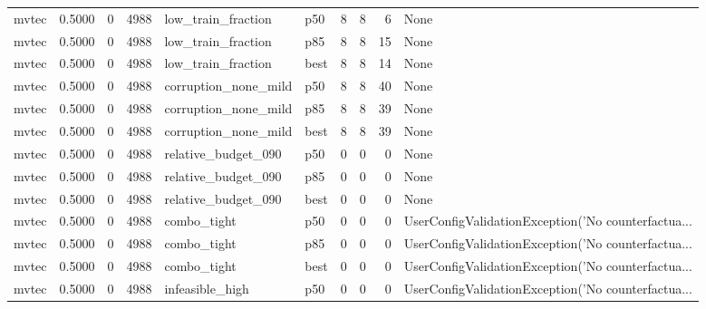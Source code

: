 \begin{tabular}{lrrrllrrrl}
   mvtec &    0.5000 &    0 &   4988 &   low\_train\_fraction &    p50 &               8 &          8 &       6 &                                               None \\
   mvtec &    0.5000 &    0 &   4988 &   low\_train\_fraction &    p85 &               8 &          8 &      15 &                                               None \\
   mvtec &    0.5000 &    0 &   4988 &   low\_train\_fraction &   best &               8 &          8 &      14 &                                               None \\
   mvtec &    0.5000 &    0 &   4988 & corruption\_none\_mild &    p50 &               8 &          8 &      40 &                                               None \\
   mvtec &    0.5000 &    0 &   4988 & corruption\_none\_mild &    p85 &               8 &          8 &      39 &                                               None \\
   mvtec &    0.5000 &    0 &   4988 & corruption\_none\_mild &   best &               8 &          8 &      39 &                                               None \\
   mvtec &    0.5000 &    0 &   4988 &  relative\_budget\_090 &    p50 &               0 &          0 &       0 &                                               None \\
   mvtec &    0.5000 &    0 &   4988 &  relative\_budget\_090 &    p85 &               0 &          0 &       0 &                                               None \\
   mvtec &    0.5000 &    0 &   4988 &  relative\_budget\_090 &   best &               0 &          0 &       0 &                                               None \\
   mvtec &    0.5000 &    0 &   4988 &          combo\_tight &    p50 &               0 &          0 &       0 & UserConfigValidationException('No counterfactua... \\
   mvtec &    0.5000 &    0 &   4988 &          combo\_tight &    p85 &               0 &          0 &       0 & UserConfigValidationException('No counterfactua... \\
   mvtec &    0.5000 &    0 &   4988 &          combo\_tight &   best &               0 &          0 &       0 & UserConfigValidationException('No counterfactua... \\
   mvtec &    0.5000 &    0 &   4988 &      infeasible\_high &    p50 &               0 &          0 &       0 & UserConfigValidationException('No counterfactua... \\

\end{tabular}
